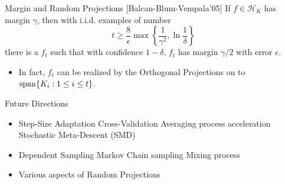 \documentclass[pdf,slideColor,colorBG]{prosper}
\theoremstyle{theorem}
\theoremstyle{definition}
\theoremstyle{remark}
\def\H{{\mathscr H}}
\def\span{{\rm span}}
\def\ga{{\gamma}}
\begin{document}
%
\begin{slide}{Margin and Random Projections}
[Balcan-Blum-Vempala'05] If $f\in \H_K$ has margin $\ga$, then with i.i.d. examples of number
\[ t \geq  \frac{8}{\epsilon} \max\left \{ \frac{1}{\ga^2}, \ln \frac{1}{\delta} \right \} \]
there is a $f_t$ such that with confidence $1-\delta$, $f_t$ has margin $\ga/2$ with
error $\epsilon$.

\medskip

\begin{itemize}
    \item In fact, $f_t$ can be realized by the Orthogonal Projections on to
    $\span \{K_i:1\leq i \leq t\}$.
\end{itemize}
\end{slide}

%
\begin{slide}{Future Directions}

\begin{itemize}
    \item Step-Size Adaptation
        \subitem Cross-Validation
        \subitem Averaging process acceleration
        \subitem Stochastic Meta-Descent (SMD)
    \item Dependent Sampling
        \subitem Markov Chain sampling
        \subitem Mixing process
    \item Various aspects of Random Projections
\end{itemize}

\end{slide}
\end{document}
